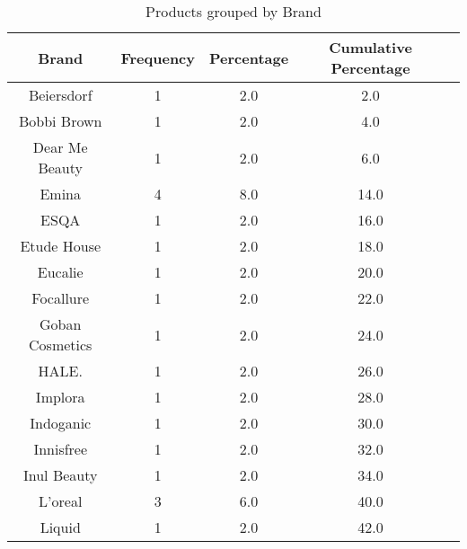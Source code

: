 \begin{table}[htb!]
    \centering
    \caption{Products grouped by Brand}
    \label{tab:prod_by_brand}
    \begin{tabular}{ccccc}        \hline
        \textbf{Brand}    & \textbf{Frequency} & \textbf{Percentage} & \textbf{Cumulative Percentage} \\ \hline
        Beiersdorf        & 1                  & 2.0                 & 2.0                            \\
        Bobbi Brown       & 1                  & 2.0                 & 4.0                            \\
        Dear Me Beauty    & 1                  & 2.0                 & 6.0                            \\
        Emina             & 4                  & 8.0                 & 14.0                           \\
        ESQA              & 1                  & 2.0                 & 16.0                           \\
        Etude House       & 1                  & 2.0                 & 18.0                           \\
        Eucalie           & 1                  & 2.0                 & 20.0                           \\
        Focallure         & 1                  & 2.0                 & 22.0                           \\
        Goban Cosmetics   & 1                  & 2.0                 & 24.0                           \\
        HALE.             & 1                  & 2.0                 & 26.0                           \\
        Implora           & 1                  & 2.0                 & 28.0                           \\
        Indoganic         & 1                  & 2.0                 & 30.0                           \\
        Innisfree         & 1                  & 2.0                 & 32.0                           \\
        Inul Beauty       & 1                  & 2.0                 & 34.0                           \\
        L'oreal           & 3                  & 6.0                 & 40.0                           \\
        Liquid            & 1                  & 2.0                 & 42.0                           \\

\end{tabular}
\end{table}
